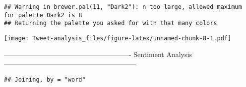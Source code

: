 \documentclass[
]{article}
\newenvironment{Shaded}{\begin{snugshade}}{\end{snugshade}}
\newcommand{\DataTypeTok}[1]{\textcolor[rgb]{0.13,0.29,0.53}{#1}}
\newcommand{\DecValTok}[1]{\textcolor[rgb]{0.00,0.00,0.81}{#1}}
\newcommand{\KeywordTok}[1]{\textcolor[rgb]{0.13,0.29,0.53}{\textbf{#1}}}
\newcommand{\NormalTok}[1]{#1}
\newcommand{\OperatorTok}[1]{\textcolor[rgb]{0.81,0.36,0.00}{\textbf{#1}}}
\newcommand{\StringTok}[1]{\textcolor[rgb]{0.31,0.60,0.02}{#1}}
\begin{document}
\begin{verbatim}
## Warning in brewer.pal(11, "Dark2"): n too large, allowed maximum for palette Dark2 is 8
## Returning the palette you asked for with that many colors
\end{verbatim}

\texttt{[image: Tweet-analysis\_files/figure-latex/unnamed-chunk-8-1.pdf]}

------------------------------------------------------- Sentiment
Analysis ---------------------------------------------------------

\begin{Shaded}
\end{Shaded}

\begin{verbatim}
## Joining, by = "word"
\end{verbatim}

\begin{Shaded}
\end{Shaded}
\end{document}
